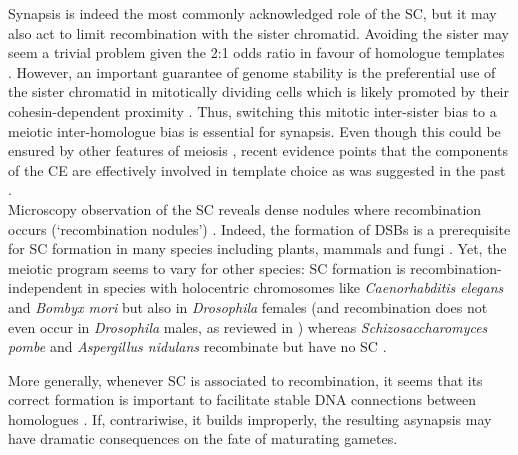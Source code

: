 Synapsis is indeed the most commonly acknowledged role of the SC, but it may also act to limit recombination with the sister chromatid.
Avoiding the sister may seem a trivial problem given the 2:1 odds ratio in favour of homologue templates \citep{lao2010trying}. 
However, an important guarantee of genome stability is the preferential use of the sister chromatid in mitotically dividing cells \citep{kadyk1992sister,bzymek2010double} which is likely promoted by their cohesin-dependent proximity \citep{sjogren2010sphase}.
Thus, switching this mitotic inter-sister bias to a meiotic inter-homologue bias is essential for synapsis.
Even though this could be ensured by other features of meiosis \citep[reviewed in \citealp{humphryes2014non}]{schwacha1997interhomolog, goldfarb2010frequent, hong2013logic}, recent evidence points that the components of the CE are effectively involved in template choice \citep{kim2010sister} as was suggested in the past \citep{haber1998meiosis}.\\

Microscopy observation of the SC reveals dense nodules where recombination occurs (‘recombination nodules’) \citep{carpenter1975electron, schmekel1998evidence}.
Indeed, the formation of DSBs is a prerequisite for SC formation in many species including plants, mammals and fungi \citep{zickler1999meiotic, henderson2004tying}.
Yet, the meiotic program seems to vary for other species: SC formation is recombination-independent in species with holocentric chromosomes like \textit{Caenorhabditis elegans} \citep{dernburg1998meiotic} and \textit{Bombyx mori} \citep{rasmussen1977transformation} but also in \textit{Drosophila} females \citep{mckim1998meiotic} (and recombination does not even occur in \textit{Drosophila} males, as reviewed in \citealp{tsai2011homologous}) whereas \textit{Schizosaccharomyces pombe} \citep{bahler1993unusual} and \textit{Aspergillus nidulans} \citep{egel1982meiosis} recombinate but have no SC \citep[reviewed in][]{zickler2015recombination}.

More generally, whenever SC is associated to recombination, it seems that its correct formation is important to facilitate stable DNA connections between homologues \citep[reviewed in \citealp{hunter2003synaptonemal}]{hunter2001singleend}.
If, contrariwise, it builds improperly, the resulting asynapsis may have dramatic consequences on the fate of maturating gametes.








